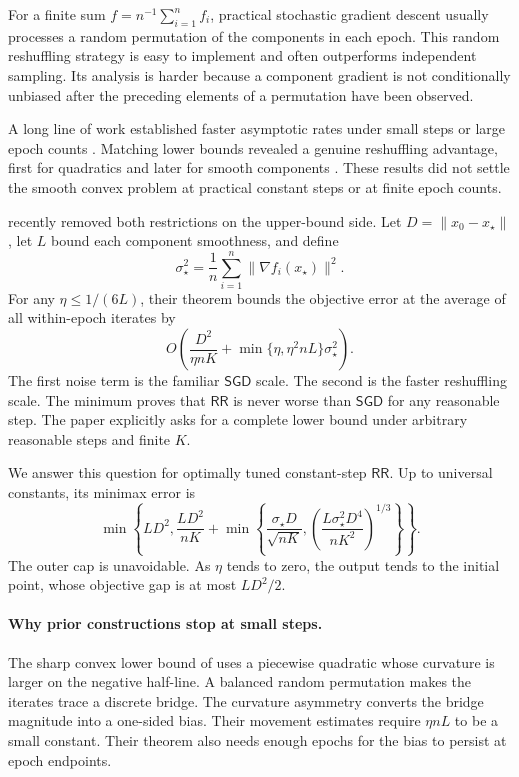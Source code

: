 \documentclass[twoside]{article}
\newcommand{\RR}{\mathsf{RR}}
\newcommand{\SGD}{\mathsf{SGD}}
\begin{document}
For a finite sum $f=n^{-1}\sum_{i=1}^n f_i$, practical stochastic gradient
descent usually processes a random permutation of the components in each
epoch. This random reshuffling strategy is easy to implement and often
outperforms independent sampling. Its analysis is harder because a component
gradient is not conditionally unbiased after the preceding elements of a
permutation have been observed.

A long line of work established faster asymptotic rates under small steps or
large epoch counts \citep{nagaraj2019sgd,haochen2019random,
mishchenko2020random,ahn2020sgd,nguyen2021unified}. Matching lower bounds revealed a genuine
reshuffling advantage, first for quadratics and later for smooth components
\citep{safran2020good,rajput2020closing,safran2021many,cha2023tighter}.
These results did not settle the smooth convex problem at practical constant
steps or at finite epoch counts.

\citet{liu2026dominates} recently removed both restrictions on the upper-bound
side. Let $D=\lVert x_0-x_\star\rVert$, let $L$ bound each component
smoothness, and define
\begin{equation}
 \sigma_\star^2=\frac1n\sum_{i=1}^n
 \lVert\nabla f_i(x_\star)\rVert^2.
 \label{eq:sigma}
\end{equation}
For any $\eta\le 1/(6L)$, their theorem bounds the objective error at the
average of all within-epoch iterates by
\begin{equation}
 O\!\left(
 \frac{D^2}{\eta nK}
 +\min\{\eta,\eta^2nL\}\sigma_\star^2
 \right).
 \label{eq:liu-fixed}
\end{equation}
The first noise term is the familiar $\SGD$ scale. The second is the faster
reshuffling scale. The minimum proves that $\RR$ is never worse than $\SGD$
for any reasonable step. The paper explicitly asks for a complete lower bound
under arbitrary reasonable steps and finite $K$.

We answer this question for optimally tuned constant-step $\RR$. Up to
universal constants, its minimax error is
\begin{equation}
 \min\!\left\{LD^2,\frac{LD^2}{nK}
 +\min\!\left\{
 \frac{\sigma_\star D}{\sqrt{nK}},
 \left(\frac{L\sigma_\star^2D^4}{nK^2}\right)^{1/3}
 \right\}\right\}.
 \label{eq:rate-intro}
\end{equation}
The outer cap is unavoidable. As $\eta$ tends to zero, the output tends to the
initial point, whose objective gap is at most $LD^2/2$.

\paragraph{Why prior constructions stop at small steps.}
The sharp convex lower bound of \citet{cha2023tighter} uses a piecewise
quadratic whose curvature is larger on the negative half-line. A balanced
random permutation makes the iterates trace a discrete bridge. The curvature
asymmetry converts the bridge magnitude into a one-sided bias. Their movement
estimates require $\eta nL$ to be a small constant. Their theorem also needs
enough epochs for the bias to persist at epoch endpoints.
\end{document}
